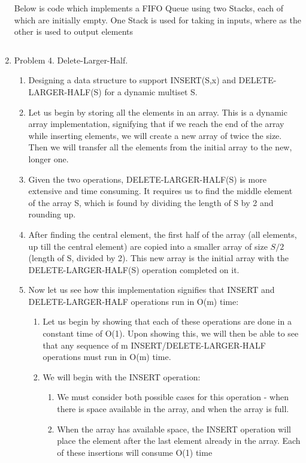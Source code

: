 \documentclass[11pt]{article}
\begin{document}
\begin{enumerate}
\begin{enumerate}
    
    \end{enumerate}

\pagebreak

Below is code which implements a FIFO Queue using two Stacks, each of which are initially empty. One Stack is used for taking in inputs, where as the other is used to output elements
    \inputminted[autogobble]{java}{Queue.java}
\pagebreak

\item Problem 4. Delete-Larger-Half.
    \begin{enumerate}
        \item Designing a data structure to support INSERT(S,x) and DELETE-LARGER-HALF(S) for a dynamic multiset S.
        \item Let us begin by storing all the elements in an array. This is a dynamic array implementation, signifying that if we reach the end of the array while inserting elements, we will create a new array of twice the size. Then we will transfer all the elements from the initial array to the new, longer one. 
        \item Given the two operations, DELETE-LARGER-HALF(S) is more extensive and time consuming. It requires us to find the middle element of the array S, which is found by dividing the length of S by 2 and rounding up. 
        \item After finding the central element, the first half of the array (all elements, up till the central element) are copied into a smaller array of size $S/2$ (length of S, divided by 2). This new array is the initial array with the DELETE-LARGER-HALF(S) operation completed on it.
        \item Now let us see how this implementation signifies that INSERT and DELETE-LARGER-HALF operations run in O(m) time:
        \begin{enumerate}
            \item Let us begin by showing that each of these operations are done in a constant time of O(1). Upon showing this, we will then be able to see that any sequence of m INSERT/DELETE-LARGER-HALF operations must run in O(m) time.
            \item We will begin with the INSERT operation:
                \begin{enumerate}
                    \item We must consider both possible cases for this operation - when there is space available in the array, and when the array is full.
                    \item When the array has available space, the INSERT operation will place the element after the last element already in the array. Each of these insertions will consume O(1) time

\end{enumerate}
\end{enumerate}
\end{enumerate}
\end{enumerate}
\end{document}
